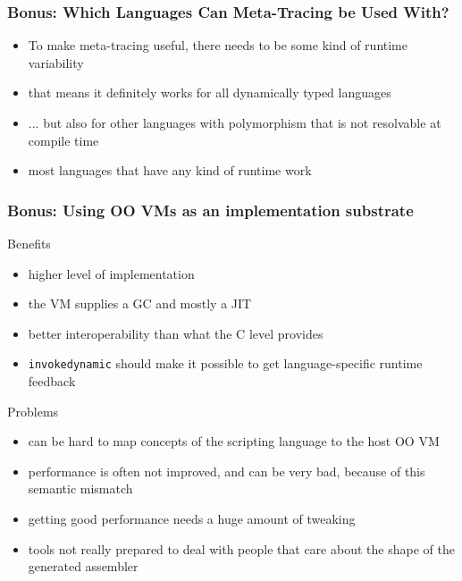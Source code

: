 \documentclass[utf8x]{beamer}
\begin{document}
\begin{frame}[label=which-langs]
  \frametitle{Bonus: Which Languages Can Meta-Tracing be Used With?}
  \begin{itemize}
      \item To make meta-tracing useful, there needs to be some kind of runtime variability
      \item that means it definitely works for all dynamically typed languages
      \item ... but also for other languages with polymorphism that is not resolvable at compile time
      \item most languages that have any kind of runtime work
  \end{itemize}
\end{frame}

\begin{frame}[label=OOVM]
  \frametitle{Bonus: Using OO VMs as an implementation substrate}
  \begin{block}{Benefits}
      \begin{itemize}
          \item higher level of implementation
          \item the VM supplies a GC and mostly a JIT
          \item better interoperability than what the C level provides
          \item \texttt{invokedynamic} should make it possible to get language-specific runtime feedback
      \end{itemize}
  \end{block}
  \pause
  \begin{block}{Problems}
      \begin{itemize}
          \item can be hard to map concepts of the scripting language to
            the host OO VM
          \item performance is often not improved, and can be very bad, because of this
            semantic mismatch
          \item getting good performance needs a huge amount of tweaking
          \item tools not really prepared to deal with people that care about
          the shape of the generated assembler
      \end{itemize}
  \end{block}
  \pause
\end{frame}
\end{document}

